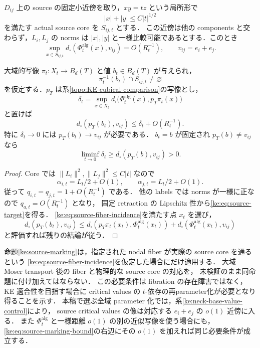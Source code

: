 \begin{proposition}
\label{ke:source-marking}
$D_{ij}$ 上の source の固定小近傍を取り，$xy=tz$ という局所形で
\[
 |x|+|y|\le C|t|^{1/2}
\]
を満たす actual source core を $S_{ij,t}$ とする．
この近傍は他の components と交わらず，$L_i,L_j$ の norms は
$|x|,|y|$ と一様比較可能であるとする．このとき
\begin{equation}\label{ke:eq:source-target}
 \sup_{x\in S_{ij,t}}
 d_\square(\Phi_t^{\mathrm{alg}}(x),v_{ij})=O(R_t^{-1}),
 \qquad v_{ij}=e_i+e_j.
\end{equation}

大域的写像 $\pi_t:X_t\to B_d(T)$ と値 $b_t\in B_d(T)$ が与えられ，
\begin{equation}\label{ke:eq:source-fiber-incidence}
 \pi_t^{-1}(b_t)\cap S_{ij,t}\ne\varnothing
\end{equation}
を仮定する．$p_T$ は系\ref{topo:KE-cubical-comparison}の写像とし，
\[
 \delta_t=\sup_{x\in X_t}
 d_\square\bigl(\Phi_t^{\mathrm{alg}}(x),p_T\pi_t(x)\bigr)
\]
と置けば
\begin{equation}\label{ke:eq:source-marking-bound}
 d_\square(p_T(b_t),v_{ij})\le\delta_t+O(R_t^{-1}).
\end{equation}
特に $\delta_t\to0$ には $p_T(b_t)\to v_{ij}$ が必要である．
$b_t=b$ が固定され $p_T(b)\ne v_{ij}$ なら
\[
 \liminf_{t\to0}\delta_t\ge d_\square(p_T(b),v_{ij})>0.
\]
\end{proposition}
\begin{proof}
Core では $\|L_i\|^2,\|L_j\|^2\le C|t|$ なので
\[
 \alpha_{i,t}=L_t/2+O(1),\qquad
 \alpha_{j,t}=L_t/2+O(1).
\]
従って $q_{i,t}=q_{j,t}=1+O(R_t^{-1})$ である．
他の labels では norms が一様に正なので $q_{a,t}=O(R_t^{-1})$ となり，
固定 retraction の Lipschitz 性から\eqref{ke:eq:source-target}を得る．
\eqref{ke:eq:source-fiber-incidence}を満たす点 $x_t$ を選び，
\[
 d_\square(p_T(b_t),v_{ij})
 \le d_\square(p_T\pi_t(x_t),\Phi_t^{\mathrm{alg}}(x_t))
      +d_\square(\Phi_t^{\mathrm{alg}}(x_t),v_{ij})
\]
と評価すれば残りの結論が従う．
\end{proof}

\begin{remark}
命題\ref{ke:source-marking}は，指定された nodal fiber が実際の source core を通るという
\eqref{ke:eq:source-fiber-incidence}を仮定した場合にだけ適用する．
大域 Moser transport 後の fiber と物理的な source core の対応を，
未検証のまま同命題に付け加えてはならない．
この必要条件は fibration の存在障害ではなく，KE 適合性を目指す場合に
critical values の $t$-依存の再parameter化が必要となり得ることを示す．
本稿で選ぶ全域 parameter 化では，系\ref{ke:neck-base-value-control}により，
source critical values の像は対応する $e_i+e_j$ の $o(1)$ 近傍に入る．
また $\Phi_t^{\mathrm{alg}}$ と一様距離 $o(1)$ の別の近似写像を使う場合にも，
\eqref{ke:eq:source-marking-bound}の右辺にその $o(1)$ を加えれば同じ必要条件が成立する．
\end{remark}
